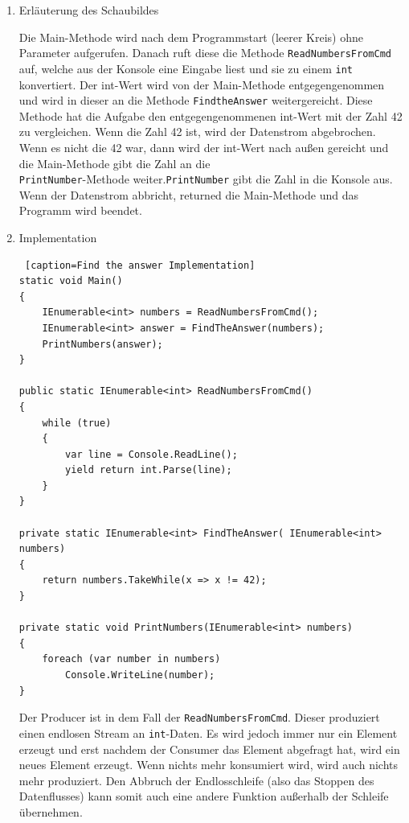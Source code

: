 \begin{enumerate}
\item Erläuterung des Schaubildes

Die  Main-Methode wird nach dem Programmstart (leerer Kreis) ohne Parameter aufgerufen.
Danach ruft diese die Methode \texttt{ReadNumbersFromCmd} auf, welche aus der Konsole eine Eingabe liest und sie
zu einem  \texttt{int} konvertiert. Der int-Wert wird von der Main-Methode entgegengenommen und wird in dieser an die Methode \texttt{FindtheAnswer} weitergereicht.
Diese Methode hat die Aufgabe den entgegengenommenen int-Wert mit der Zahl 42 zu vergleichen. Wenn die Zahl 42 ist, wird der Datenstrom
abgebrochen. Wenn es nicht die 42 war, dann wird der int-Wert nach außen gereicht und die Main-Methode gibt die Zahl an die
\\\texttt{PrintNumber}-Methode weiter.\texttt{PrintNumber} gibt die Zahl in die Konsole aus.
Wenn der Datenstrom abbricht, returned die Main-Methode und das Programm wird beendet.

\item Implementation
\\
\begin{lstlisting} [caption=Find the answer Implementation]
static void Main()
{
	IEnumerable<int> numbers = ReadNumbersFromCmd();
	IEnumerable<int> answer = FindTheAnswer(numbers);
	PrintNumbers(answer);
}

public static IEnumerable<int> ReadNumbersFromCmd()
{
	while (true)
	{
		var line = Console.ReadLine();
		yield return int.Parse(line);
	}
}

private static IEnumerable<int> FindTheAnswer( IEnumerable<int> numbers)
{
	return numbers.TakeWhile(x => x != 42);
}

private static void PrintNumbers(IEnumerable<int> numbers)
{
	foreach (var number in numbers)    
		Console.WriteLine(number);    
}
\end{lstlisting}

Der Producer ist in dem Fall der \texttt{ReadNumbersFromCmd}.
Dieser produziert einen endlosen Stream an \texttt{int}-Daten.
Es wird jedoch immer nur ein Element erzeugt und erst nachdem der Consumer das
Element abgefragt hat, wird ein neues Element erzeugt.
Wenn nichts mehr konsumiert wird, wird auch nichts mehr produziert.
Den Abbruch der Endlosschleife (also das Stoppen des Datenflusses) kann somit auch eine andere Funktion außerhalb der Schleife
übernehmen.
\end{enumerate}




